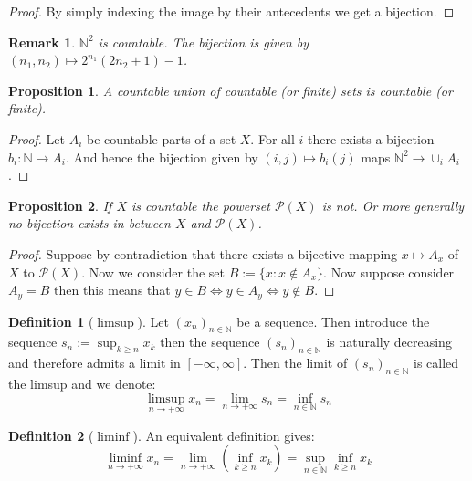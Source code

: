 \documentclass[10pt,a4paper]{book}
\newtheorem{proposition}{Proposition}[section]
\newtheorem*{remark}{Remark}
\theoremstyle{definition}
\newtheorem{definition}{Definition}[section]
\begin{document}
\begin{proof}

By simply indexing the image by their antecedents we get a bijection.

\end{proof}

\begin{remark}
$\mathbb{N}^2$ is countable. The bijection is given by $(n_1, n_2) \mapsto 2^{n_1}(2 n_2 + 1) - 1$. 
\end{remark}

\begin{proposition}

A countable union of countable (or finite) sets is countable (or finite). 

\end{proposition}

\begin{proof}

Let $A_i$ be countable parts of a set $X$. For all $i$ there exists a bijection $b_i : \mathbb{N} \to A_i$. And hence the bijection given by $(i, j) \mapsto b_i(j)$ maps $\mathbb{N}^2 \to \cup_i A_i$. 

\end{proof}

\begin{proposition}
If $X$ is countable the powerset $\mathcal{P}(X)$ is not. Or more generally no bijection exists in between $X$ and $\mathcal{P}(X)$.
\end{proposition}

\begin{proof}
Suppose by contradiction that there exists a bijective mapping $x \mapsto A_x$ of $X$ to $\mathcal{P}(X)$. Now we consider the set $B := \{x : x \not \in A_x\}$. Now suppose consider $A_y = B$ then this means that $y \in B \Leftrightarrow y \in A_y \Leftrightarrow y \not\in B$.  
\end{proof}

\begin{definition}[$\limsup$]
Let $(x_n)_{n \in \mathbb{N}}$ be a sequence. Then introduce the sequence $s_n := \sup_{k \geq n} x_k$ then the sequence $(s_n)_{n \in \mathbb{N}}$ is naturally decreasing and therefore admits a limit in $[-\infty, \infty]$. Then the limit of $(s_n)_{n \in \mathbb{N}}$ is called the limsup and we denote:
\[
\limsup_{n \to +\infty} x_n = \lim_{n \to +\infty} s_n = \inf_{n \in \mathbb{N}} s_n
\]
\end{definition}

\begin{definition}[$\liminf$]
An equivalent definition gives:
\[
\liminf_{n \to +\infty} x_n = \lim_{n \to +\infty} (\inf_{k \geq n} x_k) = \sup_{n \in \mathbb{N}} \inf_{k \geq n} x_k
\]
\end{definition}
\end{document}
